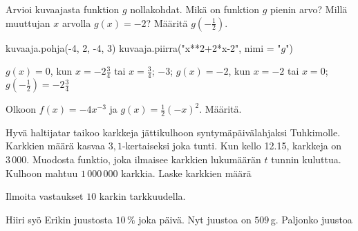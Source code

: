\begin{tehtava}
Arvioi kuvaajasta funktion $g$ nollakohdat. Mikä on funktion $g$ pienin arvo? Millä muuttujan $x$ arvolla $g(x)=-2$? Määritä $g\left(-\frac{1}{2}\right)$.
\begin{kuva}
    kuvaaja.pohja(-4, 2, -4, 3)
    kuvaaja.piirra("x**2+2*x-2", nimi = "$g$")
\end{kuva}

\begin{vastaus}
	$g(x)=0$, kun $x=-2\frac{3}{4}$ tai $x=\frac{3}{4}$; $-3$; $g(x)=-2$, kun $x=-2$ tai $x=0$; $g\left(-\frac{1}{2}\right)=-2\frac{3}{4}$
		
\end{vastaus}
\end{tehtava}

\begin{tehtava}
	Olkoon $f(x)=-4x^{-3}$ ja $g(x)=\frac{1}{2}(-x)^{2}$. Määritä.
	
	
\begin{vastaus}
\end{vastaus}
\end{tehtava}
	
	\begin{tehtava}
	Hyvä haltijatar taikoo karkkeja jättikulhoon syntymäpäivälahjaksi Tuhkimolle. Karkkien määrä kasvaa $3,1$-kertaiseksi joka tunti. Kun kello 12.15, karkkeja on $3\,000$. Muodosta funktio, joka ilmaisee karkkien lukumäärän $t$ tunnin kuluttua. Kulhoon mahtuu $1\,000\,000$ karkkia. Laske karkkien määrä
	
	Ilmoita vastaukset $10$ karkin tarkkuudella.

\begin{vastaus}
\end{vastaus}
\end{tehtava}

\begin{tehtava}
	Hiiri syö Erikin juustosta $10\,\%$ joka päivä. Nyt juustoa on $509$\,g. Paljonko juustoa
	
\begin{vastaus}
\end{vastaus}
\end{tehtava}

\newpage